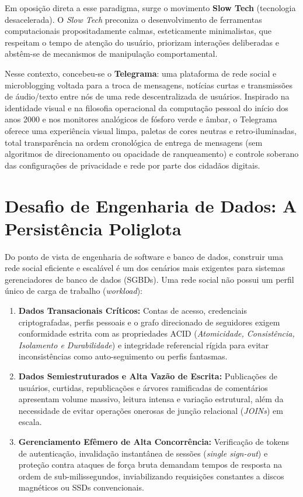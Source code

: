 \documentclass[12pt,a4paper]{report}
\begin{document}
Em oposição direta a esse paradigma, surge o movimento \textbf{Slow Tech} (tecnologia desacelerada). O \textit{Slow Tech} preconiza o desenvolvimento de ferramentas computacionais propositadamente calmas, esteticamente minimalistas, que respeitam o tempo de atenção do usuário, priorizam interações deliberadas e abstêm-se de mecanismos de manipulação comportamental.

Nesse contexto, concebeu-se o \textbf{Telegrama}: uma plataforma de rede social e microblogging voltada para a troca de mensagens, notícias curtas e transmissões de áudio/texto entre nós de uma rede descentralizada de usuários. Inspirado na identidade visual e na filosofia operacional da computação pessoal do início dos anos 2000 e nos monitores analógicos de fósforo verde e âmbar, o Telegrama oferece uma experiência visual limpa, paletas de cores neutras e retro-iluminadas, total transparência na ordem cronológica de entrega de mensagens (sem algoritmos de direcionamento ou opacidade de ranqueamento) e controle soberano das configurações de privacidade e rede por parte dos cidadãos digitais.

\section{Desafio de Engenharia de Dados: A Persistência Poliglota}
Do ponto de vista de engenharia de software e banco de dados, construir uma rede social eficiente e escalável é um dos cenários mais exigentes para sistemas gerenciadores de banco de dados (SGBDs). Uma rede social não possui um perfil único de carga de trabalho (\textit{workload}):
\begin{enumerate}
    \item \textbf{Dados Transacionais Críticos:} Contas de acesso, credenciais criptografadas, perfis pessoais e o grafo direcionado de seguidores exigem conformidade estrita com as propriedades ACID (\textit{Atomicidade, Consistência, Isolamento e Durabilidade}) e integridade referencial rígida para evitar inconsistências como auto-seguimento ou perfis fantasmas.
    \item \textbf{Dados Semiestruturados e Alta Vazão de Escrita:} Publicações de usuários, curtidas, republicações e árvores ramificadas de comentários apresentam volume massivo, leitura intensa e variação estrutural, além da necessidade de evitar operações onerosas de junção relacional (\textit{JOINs}) em escala.
    \item \textbf{Gerenciamento Efêmero de Alta Concorrência:} Verificação de tokens de autenticação, invalidação instantânea de sessões (\textit{single sign-out}) e proteção contra ataques de força bruta demandam tempos de resposta na ordem de sub-milissegundos, inviabilizando requisições constantes a discos magnéticos ou SSDs convencionais.
\end{enumerate}
\end{document}
